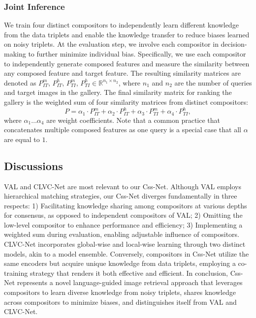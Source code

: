 \documentclass[sigconf]{acmart}
\begin{document}
\subsubsection{Joint Inference}
\label{subsubsec:joint_infer}
We train four distinct compositors to independently learn different knowledge from the data triplets and enable the knowledge transfer to reduce biases learned on noisy triplets. At the evaluation step, we involve each compositor in decision-making to further minimize individual bias. Specifically, we use each compositor to independently generate composed features and measure the similarity between any composed feature and target feature. The resulting similarity matrices are denoted as $P_{IT}^m$, $P_{IT}^h$, $P_{TI}^m$, $P_{TI}^h \in \mathbb{R}^{n_1 \times n_2}$, where $n_1$ and $n_2$ are the number of queries and target images in the gallery. The final similarity matrix for ranking the gallery is the weighted sum of four similarity matrices from distinct compositors:
\begin{equation}
\label{eq:jointinfer}
    P = \alpha_1 \cdot P_{IT}^m + \alpha_2 \cdot P_{IT}^h + \alpha_3 \cdot P_{TI}^m + \alpha_4 \cdot P_{TI}^h,
\end{equation}
where $\alpha_{1} \dots \alpha_{4}$ are weight coefficients. Note that a common practice that concatenates multiple composed features as one query is a special case that all $\alpha$ are equal to $1$.

\subsection{Discussions}
\label{subsec:discussion}

VAL \cite{chen2020image} and CLVC-Net \cite{wen2021comprehensive} are most relevant to our Css-Net. Although VAL employs hierarchical matching strategies, our Css-Net diverges fundamentally in three respects: 1) Facilitating knowledge sharing among compositors at various depths for consensus, as opposed to independent compositors of VAL; 2) Omitting the low-level compositor to enhance performance and efficiency; 3) Implementing a weighted sum during evaluation, enabling adjustable influence of compositors. CLVC-Net incorporates global-wise and local-wise learning through two distinct models, akin to a model ensemble. Conversely, compositors in Css-Net utilize the same encoders but acquire unique knowledge from data triplets, employing a co-training strategy that renders it both effective and efficient. In conclusion, Css-Net represents a novel language-guided image retrieval approach that leverages compositors to learn diverse knowledge from noisy triplets, shares knowledge across compositors to minimize biases, and distinguishes itself from VAL and CLVC-Net.
\end{document}
